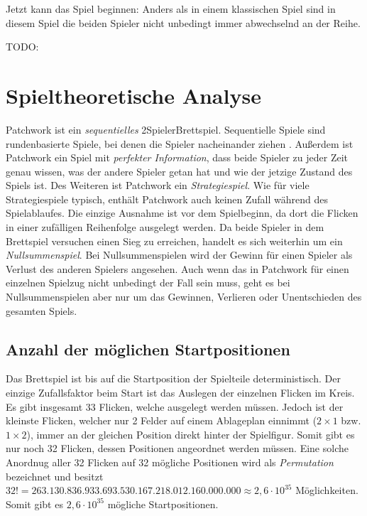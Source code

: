 Jetzt kann das Spiel beginnen: Anders als in einem klassischen Spiel sind in diesem Spiel die beiden Spieler nicht unbedingt immer abwechselnd an der Reihe.

TODO:

\section{Spieltheoretische Analyse}

Patchwork ist ein \emph{sequentielles} 2\textendash{}Spieler\textendash{}Brettspiel. Sequentielle Spiele sind rundenbasierte Spiele, bei denen die Spieler nacheinander ziehen \cite[S. 53]{2014.GameTheoryThroughExamples}. Außerdem ist Patchwork ein Spiel mit \emph{perfekter Information}, \dash dass beide Spieler zu jeder Zeit genau wissen, was der andere Spieler getan hat und wie der jetzige Zustand des Spiels ist. Des Weiteren ist Patchwork ein \emph{Strategiespiel}. Wie für viele Strategiespiele typisch, enthält Patchwork auch keinen Zufall während des Spielablaufes. Die einzige Ausnahme ist vor dem Spielbeginn, da dort die Flicken in einer zufälligen Reihenfolge ausgelegt werden. Da beide Spieler in dem Brettspiel versuchen einen Sieg zu erreichen, handelt es sich weiterhin um ein \emph{Nullsummenspiel}. Bei Nullsummenspielen wird der Gewinn für einen Spieler als Verlust des anderen Spielers angesehen. Auch wenn das in Patchwork für einen einzelnen Spielzug nicht unbedingt der Fall sein muss, geht es bei Nullsummenspielen aber nur um das Gewinnen, Verlieren oder Unentschieden des gesamten Spiels.

\subsection*{Anzahl der möglichen Startpositionen}

Das Brettspiel ist bis auf die Startposition der Spielteile deterministisch. Der einzige Zufallsfaktor beim Start ist das Auslegen der einzelnen Flicken im Kreis. Es gibt insgesamt 33 Flicken, welche ausgelegt werden müssen. Jedoch ist der kleinste Flicken, welcher nur 2 Felder auf einem Ablageplan einnimmt ($2\times1$ bzw. $1\times2$), immer an der gleichen Position direkt hinter der Spielfigur. Somit gibt es nur noch 32 Flicken, dessen Positionen angeordnet werden müssen. Eine solche Anordnug aller 32 Flicken auf 32 mögliche Positionen wird als \emph{Permutation} bezeichnet und besitzt $32! = 263.130.836.933.693.530.167.218.012.160.000.000 \approx 2,6 \cdot 10^{35}$ Möglichkeiten. Somit gibt es $2,6 \cdot 10^{35}$ mögliche Startpositionen.

